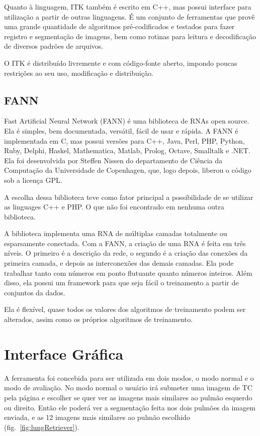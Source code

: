 Quanto à linguagem, ITK também é escrito em C++, mas possui interface para utilização a partir de outras linguagens. É um conjunto de ferramentas que provê uma grande quantidade de algoritmos pré-codificados e testados para fazer registro e segmentação de imagens, bem como rotinas para leitura e decodificação de diversos padrões de arquivos.

O ITK é distribuído livremente e com código-fonte aberto, impondo poucas restrições ao seu uso, modificação e distribuição.

\subsection{FANN}

Fast Artificial Neural Network (FANN) é uma biblioteca de RNAs open source. Ela é simples, bem documentada, versátil, fácil de usar e rápida. A FANN é implementada em C, mas possui versões para C++, Java, Perl, PHP, Python, Ruby, Delphi, Haskel, Mathematica, Matlab, Prolog, Octave, Smalltalk e .NET. Ela foi desenvolvida por Steffen Nissen do departamento de Ciência da Computação da Universidade de Copenhagen, que, logo depois, liberou o código sob a licença GPL.

A escolha dessa biblioteca teve como fator principal a possibilidade de se utilizar as linguages C++ e PHP. O que não foi encontrado em nenhuma outra biblioteca.

A biblioteca implementa uma RNA de múltiplas camadas totalmente ou esparsamente conectada. Com a FANN, a criação de uma RNA é feita em três níveis. O primeiro é a descrição da rede, o segundo é a criação das conexões da primeira camada, e depois as interconexões das demais camadas. Ela pode trabalhar tanto com números em ponto flutuante quanto números inteiros. Além disso, ela possui um framework para que seja fácil o treinamento a partir de conjuntos da dados.

Ela é flexível, quase todos os valores dos algoritmos de treinamento podem ser alterados, assim como os próprios algoritmos de treinamento.

\section{Interface Gráfica}

A ferramenta foi concebida para ser utilizada em dois modos, o modo normal e o modo de avaliação. No modo normal o usuário irá submeter uma imagem de TC pela página e escolher se quer ver as imagens mais similares ao pulmão esquerdo ou direito. Então ele poderá ver a segmentação feita nos dois pulmões da imagem enviada, e as 12 imagens mais similares ao pulmão escolhido (fig.~\ref{fig:lungRetriever}).

